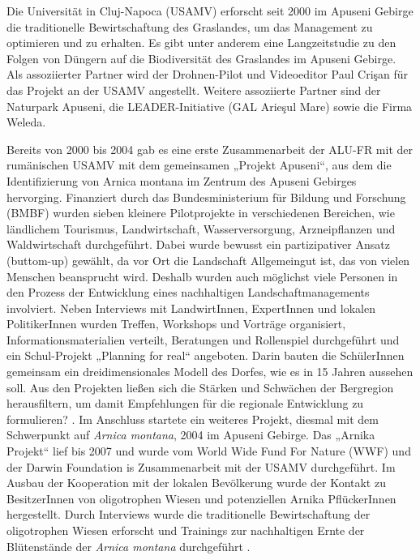 Die Universität in Cluj-Napoca (USAMV) erforscht seit 2000 im Apuseni Gebirge die traditionelle Bewirtschaftung des Graslandes, um das Management zu optimieren und zu erhalten. Es gibt unter anderem eine Langzeitstudie zu den Folgen von Düngern auf die Biodiversität des Graslandes im Apuseni Gebirge. Als assoziierter Partner wird der Drohnen-Pilot und Videoeditor Paul Crişan für das Projekt an der USAMV angestellt. Weitere assoziierte Partner sind der Naturpark Apuseni, die LEADER-Initiative (GAL Arieşul Mare) sowie die Firma Weleda.

Bereits von 2000 bis 2004 gab es eine erste Zusammenarbeit der ALU-FR mit der rumänischen USAMV mit dem gemeinsamen „Projekt Apuseni“, aus dem die Identifizierung von Arnica montana im Zentrum des Apuseni Gebirges hervorging. Finanziert durch das Bundesministerium für Bildung und Forschung (BMBF) wurden sieben kleinere Pilotprojekte in verschiedenen Bereichen, wie ländlichem Tourismus, Landwirtschaft, Wasserversorgung, Arzneipflanzen und Waldwirtschaft durchgeführt. Dabei wurde bewusst ein partizipativer Ansatz (buttom-up) gewählt, da vor Ort die Landschaft Allgemeingut ist, das von vielen Menschen beansprucht wird. Deshalb wurden auch möglichst viele Personen in den Prozess der Entwicklung eines nachhaltigen Landschaftmanagements involviert. Neben Interviews mit LandwirtInnen, ExpertInnen und lokalen PolitikerInnen wurden Treffen, Workshops und  Vorträge organisiert, Informationsmaterialien verteilt, Beratungen und Rollenspiel durchgeführt und ein Schul-Projekt „Planning for real“ angeboten. Darin bauten die SchülerInnen gemeinsam ein dreidimensionales Modell des Dorfes, wie es in 15 Jahren aussehen soll. Aus den Projekten ließen sich die Stärken und Schwächen der Bergregion herausfiltern, um damit Empfehlungen für die regionale Entwicklung zu formulieren? \citep[vgl.][]{RUSDEA2009}.
Im Anschluss startete ein weiteres Projekt, diesmal mit dem Schwerpunkt auf \textit{Arnica montana}, 2004 im Apuseni Gebirge. Das „Arnika Projekt“ lief bis 2007 und wurde vom World Wide Fund For Nature (WWF) und der Darwin Foundation is Zusammenarbeit mit der USAMV durchgeführt. Im Ausbau der Kooperation mit der lokalen Bevölkerung wurde der Kontakt zu BesitzerInnen von oligotrophen Wiesen und potenziellen Arnika PflückerInnen hergestellt. Durch Interviews wurde die traditionelle Bewirtschaftung der oligotrophen Wiesen erforscht und Trainings zur nachhaltigen Ernte der Blütenstände der \textit{Arnica montana} durchgeführt \citep[vgl.][20]{DBU2018}.

